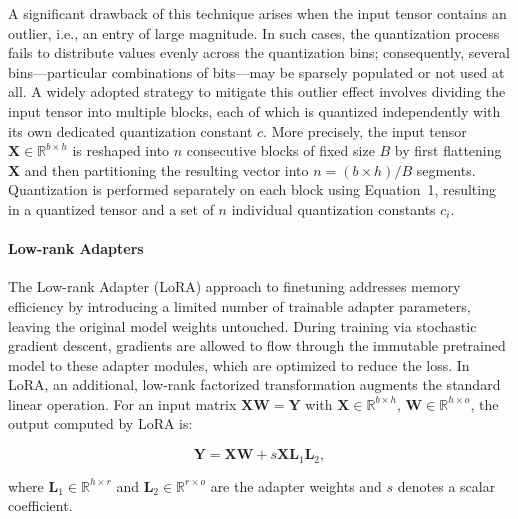 A significant drawback of this technique arises when the input tensor contains an outlier, i.e., an entry of large magnitude. In such cases, the quantization process fails to distribute values evenly across the quantization bins; consequently, several bins—particular combinations of bits—may be sparsely populated or not used at all. A widely adopted strategy to mitigate this outlier effect involves dividing the input tensor into multiple blocks, each of which is quantized independently with its own dedicated quantization constant $c$. More precisely, the input tensor $\mathbf{X}\in \mathbb{R}^{b\times h}$ is reshaped into $n$ consecutive blocks of fixed size $B$ by first flattening $\mathbf{X}$ and then partitioning the resulting vector into $n = ({b\times h})/{B}$ segments. Quantization is performed separately on each block using Equation~1, resulting in a quantized tensor and a set of $n$ individual quantization constants $c_i$.

\paragraph{Low-rank Adapters} The Low-rank Adapter (LoRA) approach to finetuning \citep{hu2021lora} addresses memory efficiency by introducing a limited number of trainable adapter parameters, leaving the original model weights untouched. During training via stochastic gradient descent, gradients are allowed to flow through the immutable pretrained model to these adapter modules, which are optimized to reduce the loss. In LoRA, an additional, low-rank factorized transformation augments the standard linear operation. For an input matrix ${\mathbf{X} \mathbf{W} = \mathbf{Y}}$ with $\mathbf{X}\in  \mathbb{R}^{b\times h}$, $\mathbf{W}\in  \mathbb{R}^{h\times o}$, the output computed by LoRA is:

\begin{equation}
    \mathbf{Y} = \mathbf{X}\mathbf{W} + s\mathbf{X}\mathbf{L}_1\mathbf{L}_2,
\end{equation}

where $\mathbf{L}_1\in  \mathbb{R}^{h\times r}$ and $\mathbf{L}_2\in  \mathbb{R}^{r\times o}$ are the adapter weights and $s$ denotes a scalar coefficient.

